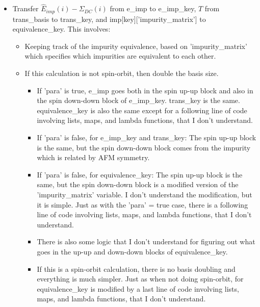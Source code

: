 \documentclass[aps,prb,singlecolumn,preprintnumbers,amsmath,amssymb]{revtex4}
\begin{document}
\begin{itemize}
\item Transfer $\hat{E}_{imp}(i)- \Sigma_{DC}(i)$ from e\_imp to e\_imp\_key, $T$ from trans\_basis to trans\_key, and imp[key]['impurity\_matrix'] to equivalence\_key.  This involves:
\begin{itemize} 
\item  Keeping track of the impurity equivalence, based on 'impurity\_matrix' which specifies which impurities are equivalent to each other.  
\item  If this calculation is not spin-orbit, then double the basis size.
\begin{itemize} 
\item If 'para' is true, e\_imp goes both in the spin up-up block and also in the spin down-down block of e\_imp\_key.  trans\_key is the same.  equivalence\_key is also the same except for a following line of code involving lists, maps, and lambda functions, that I don't understand. %
\item  If 'para' is false, for e\_imp\_key and trans\_key: The spin up-up block is the same, but the spin down-down block comes from the impurity which is related by AFM symmetry.  
\item  If 'para' is false, for equivalence\_key: The spin up-up block is the same, but the spin down-down block is a modified version of the 'impurity\_matrix' variable.  I don't understand the modification, but it is simple.  Just as with the 'para' = true case, there is a following line of code involving lists, maps, and lambda functions, that I don't understand.
\item There is also some logic that I don't understand for figuring out what goes in the up-up and down-down blocks of equivalence\_key.  
\item If this is a spin-orbit calculation, there is no basis doubling and everything is much simpler. Just as when not doing spin-orbit, for equivalence\_key is modified by a last line of code involving lists, maps, and lambda functions, that I don't understand.
\end{itemize}
\end{itemize}


\end{itemize}
\end{document}
